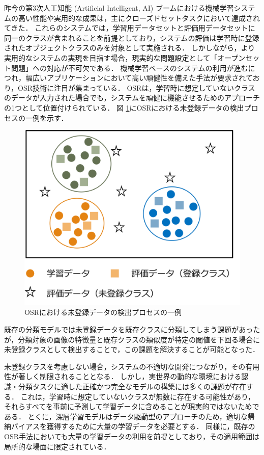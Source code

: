 \documentclass[a4paper,11pt,nomag]{jsreport}
\begin{document}
昨今の第3次人工知能 (Artificial Intelligent, AI) ブームにおける機械学習システムの高い性能や実用的な成果は，主にクローズドセットタスクにおいて達成されてきた．
これらのシステムでは，学習用データセットと評価用データセットに同一のクラスが含まれることを前提としており，システムの評価は学習時に登録されたオブジェクトクラスのみを対象として実施される．
しかしながら，より実用的なシステムの実現を目指す場合，現実的な問題設定として「オープンセット問題」への対応が不可欠である\cite{geng2021survey}．
機械学習ベースのシステムの利用が進むにつれ，幅広いアプリケーションにおいて高い頑健性を備えた手法が要求されており，OSR技術に注目が集まっている\cite{sun2023survey}．
OSRは，学習時に想定していないクラスのデータが入力された場合でも，システムを頑健に機能させるためのアプローチの1つとして位置付けられている．
図 \ref{fig:osr}にOSRにおける未登録データの検出プロセスの一例を示す．
\begin{figure}[tbp]
  \centering
  \includegraphics[width=0.6\linewidth, keepaspectratio]{image/osr.png}
  \caption{OSRにおける未登録データの検出プロセスの一例}
  \label{fig:osr}
\end{figure}
既存の分類モデルでは未登録データを既存クラスに分類してしまう課題があったが，分類対象の画像の特徴量と既存クラスの類似度が特定の閾値を下回る場合に未登録クラスとして検出することで，この課題を解決することが可能となった．

未登録クラスを考慮しない場合，システムの不適切な開発につながり，その有用性が著しく制限されることとなる．
しかし，実世界の動的な環境における認識・分類タスクに適した正確かつ完全なモデルの構築には多くの課題が存在する\cite{mahdavi2021survey}．
これは，学習時に想定していないクラスが無数に存在する可能性があり，それらすべてを事前に予測して学習データに含めることが現実的ではないためである．
とくに，深層学習モデルはデータ駆動型のアプローチのため，適切な帰納バイアスを獲得するために大量の学習データを必要とする．
同様に，既存のOSR手法においても大量の学習データの利用を前提としており，その適用範囲は局所的な場面に限定されている．
\end{document}
